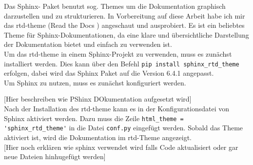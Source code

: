 Das Sphinx- Paket benutzt sog. Themes um die Dokumentation graphisch darzustellen und zu strukturieren.
In Vorbereitung auf diese Arbeit habe ich mir das rtd-theme (Read the Docs \cite{RTD}) angeschaut und ausprobiert.
Es ist ein beliebtes Theme für Sphinx-Dokumentationen, da eine klare und übersichtliche Darstellung der Dokumentation
bietet und einfach zu verwenden ist. \\
Um das rtd-theme in einem Sphinx-Projekt zu verwenden, muss es zunächst installiert werden.
Dies kann über den Befehl \verb|pip install sphinx_rtd_theme| erfolgen, dabei wird das Sphinx Paket auf die Version 6.4.1 angepasst.\\
\vspace{1cm}
Um Sphinx zu nutzen, muss es zunächst konfiguriert werden.

[Hier beschreiben wie PShinx DOkumentation aufgesetzt wird]\\

\vspace{1cm}
Nach der Installation des rtd-theme kann es in der Konfigurationsdatei von Sphinx aktiviert werden.
Dazu muss die Zeile \verb|html_theme = 'sphinx_rtd_theme'| in die Datei \verb|conf.py| eingefügt werden.
Sobald das Theme aktiviert ist, wird die Dokumentation im rtd-Theme angezeigt.\\

[Hier noch erklären wie sphinx verwendet wird falls Code aktualisiert oder gar neue Dateien hinhugefügt werden]



